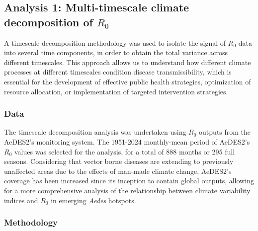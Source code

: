 \documentclass[10pt,twocolumn]{wlscirep}
\begin{document}
\subsection{Analysis 1: Multi-timescale climate decomposition of $R_0$} \label{sec-methods-1-analysis}

A timescale decomposition methodology was used to isolate the signal of $R_0$ data into several time components, in order to obtain the total variance across different timescales. This approach allows us to understand how different climate processes at different timescales condition disease transmissibility, which is essential for the development of effective public health strategies, optimization of resource allocation, or implementation of targeted intervention strategies\cite{thomson_2018a, munoz_2016}.

\subsubsection{Data} \label{sec-methods-1-data}
The timescale decomposition analysis was undertaken using $R_0$ outputs from the AeDES2's monitoring system. The 1951-2024 monthly-mean period of AeDES2's $R_0$ values was selected for the analysis, for a total of 888 months or 295 full seasons. Considering that vector borne diseases are extending to previously unaffected areas due to the effects of man-made climate change, AeDES2's coverage has been increased since its inception to contain global outputs, allowing for a more comprehensive analysis of the relationship between climate variability indices and $R_0$ in emerging \textit{Aedes} hotspots.

\subsubsection{Methodology} \label{sec-methods-1-methodology}
\end{document}
